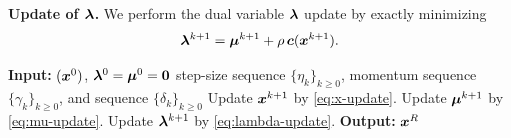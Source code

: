 \documentclass[10pt]{article}
\begin{document}
\textbf{Update of $\bm{\lambda}$.} We perform the dual variable $\bm{\lambda}$ update by exactly minimizing
\begin{equation}\label{eq:lambda-update}
    \bm{\lambda}^{k+1} = \bm{\mu}^{k+1} + \rho\,\bm{c}(\bm{x}^{k+1}).
\end{equation}

\begin{algorithm}[H]
    \caption{Linearized DualProximal ALM}
    \label{alg:PLADM-eq}
    \small
    \begin{algorithmic}[1]
        \STATE \textbf{Input:} $(\bm{x}^0)$, $\bm{\lambda}^0 = \bm{\mu}^0 = \bm{0}$
        step-size sequence $\{\eta_k\}_{k\geq 0}$, momentum sequence $\{\gamma_k\}_{k\geq 0}$, and sequence $\{\delta_k\}_{k\geq 0}$
            \STATE Update $\bm{x}^{k+1}$ by \eqref{eq:x-update}.
            \STATE Update $\bm{\mu}^{k+1}$ by \eqref{eq:mu-update}.
            \STATE Update $\bm{\lambda}^{k+1}$ by \eqref{eq:lambda-update}.
        \ENDFOR
        \STATE \textbf{Output:} $\bm{x}^R$ 
    \end{algorithmic}
\end{algorithm}
\end{document}
